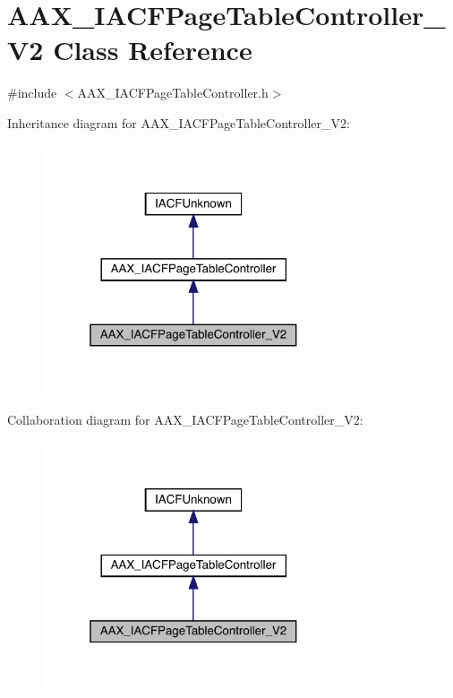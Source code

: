 \hypertarget{a01737}{}\section{A\+A\+X\+\_\+\+I\+A\+C\+F\+Page\+Table\+Controller\+\_\+\+V2 Class Reference}
\label{a01737}


{\ttfamily \#include $<$A\+A\+X\+\_\+\+I\+A\+C\+F\+Page\+Table\+Controller.\+h$>$}



Inheritance diagram for A\+A\+X\+\_\+\+I\+A\+C\+F\+Page\+Table\+Controller\+\_\+\+V2\+:
\nopagebreak
\begin{figure}[H]
\begin{center}
\leavevmode
\includegraphics[width=253pt]{a01736}
\end{center}
\end{figure}


Collaboration diagram for A\+A\+X\+\_\+\+I\+A\+C\+F\+Page\+Table\+Controller\+\_\+\+V2\+:
\nopagebreak
\begin{figure}[H]
\begin{center}
\leavevmode
\includegraphics[width=253pt]{a01735}
\end{center}
\end{figure}


